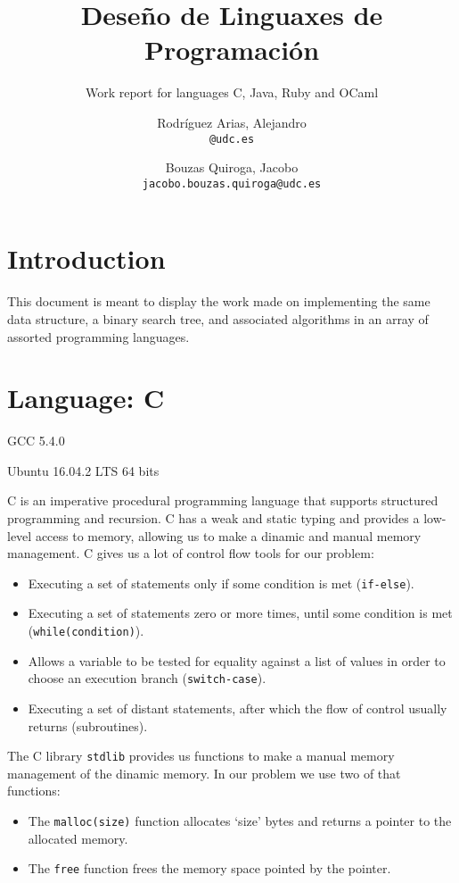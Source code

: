\documentclass[11pt]{scrartcl} %
\title{Deseño de Linguaxes de Programación}
\subtitle{Work report for languages C, Java, Ruby and OCaml}
\author{Rodríguez Arias, Alejandro\\
	\texttt{@udc.es}
	\and Bouzas Quiroga, Jacobo\\
	\texttt{jacobo.bouzas.quiroga@udc.es}}
\date{\displaydate{release}}
\begin{document}
\maketitle
\clearpage
\tableofcontents
\clearpage

\section{Introduction}

This document is meant to display the work made on implementing the same data structure, a binary search tree, and associated algorithms in an array of assorted programming languages.

\section{Language: C}

\begin{description}[align=left,labelwidth=10em]
\item [Compiler] GCC 5.4.0
\item [Operating System] Ubuntu 16.04.2 LTS 64 bits
\end{description}

C is an imperative procedural programming language that supports structured programming and recursion. C has a weak and static typing and provides a low-level access to memory, allowing us to make a dinamic and manual memory management. C gives us a lot of control flow tools for our problem:

\begin{itemize}  
\item Executing a set of statements only if some condition is met (\texttt{if-else}).
\item Executing a set of statements zero or more times, until some condition is met (\texttt{while(condition)}). 
\item Allows a variable to be tested for equality against a list of values in order to choose an execution branch (\texttt{switch-case}).
\item Executing a set of distant statements, after which the flow of control usually returns (subroutines).
\end{itemize}

The C library \texttt{stdlib} provides us  functions to make a manual memory management of the dinamic memory. In our problem we use two of that functions:
\begin{itemize}
\item The \texttt{malloc(size)} function allocates `size' bytes and returns a pointer to the allocated memory.
\item The \texttt{free} function frees the memory space pointed by the pointer.
\end{itemize}
	
\end{document}

